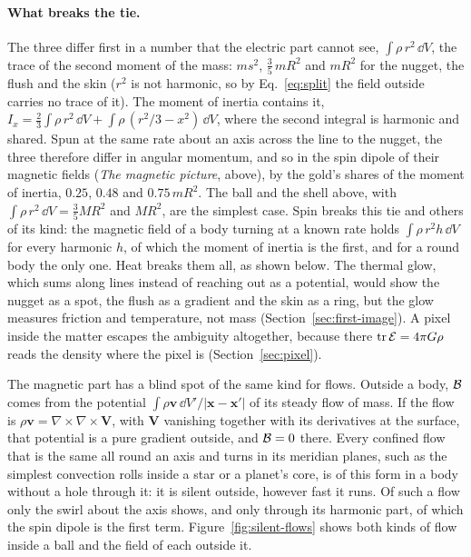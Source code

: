 \paragraph{What breaks the tie.} The three differ first in a number that the
electric part cannot see, $\int\rho\,r^2\,\dd V$, the trace of the second
moment of the mass: $m s^2$, $\tfrac35\,m R^2$ and $m R^2$ for the nugget, the
flush and the skin ($r^2$ is not harmonic, so by Eq.~\eqref{eq:split} the
field outside carries no trace of it). The moment of inertia contains it,
$I_x = \tfrac23\int\rho\,r^2\,\dd V + \int\rho\,(r^2/3 - x^2)\,\dd V$, where the
second integral is harmonic and shared. Spun at the same rate about an axis
across the line to the nugget, the three therefore differ in angular momentum,
and so in the spin dipole of their magnetic fields
(\emph{The magnetic picture}, above), by the gold's shares of the moment of inertia,
$0.25$, $0.48$ and $0.75\,mR^2$. The ball and the shell above, with
$\int\rho\,r^2\,\dd V = \tfrac35 MR^2$ and $MR^2$, are the simplest case. Spin
breaks this tie and others of its kind: the magnetic field of a body turning at
a known rate holds $\int\rho\,r^2 h\,\dd V$ for every harmonic $h$, of which the
moment of inertia is the first, and for a round body the only one. Heat breaks
them all, as shown below. The
thermal glow, which sums along lines instead of reaching out as a potential,
would show the nugget as a spot, the flush as a gradient and the skin as a ring,
but the glow measures friction and temperature, not mass
(Section~\ref{sec:first-image}). A pixel inside the matter escapes the
ambiguity altogether, because there $\mathrm{tr}\,\mathcal{E} = 4\pi G\rho$ reads the
density where the pixel is (Section~\ref{sec:pixel}).

The magnetic part has a blind spot of the same kind for flows. Outside a body,
$\mathcal{B}$ comes from the potential $\int\rho\mathbf{v}\,\dd V'/|\mathbf{x} -
\mathbf{x}'|$ of its steady flow of mass. If the flow is
$\rho\mathbf{v} = \nabla\times\nabla\times\mathbf{V}$, with $\mathbf{V}$ vanishing
together with its derivatives at the surface, that potential is a pure gradient
outside, and $\mathcal{B} = 0$ there. Every confined flow that is the same all round an axis and turns in its
meridian planes, such as the simplest convection rolls inside a star or a
planet's core, is of this form in a body without a hole through it: it is silent outside, however fast it runs. Of
such a flow only the swirl about the axis shows, and only through its harmonic
part, of which the spin dipole is the first term.
Figure~\ref{fig:silent-flows} shows both kinds of flow inside a ball and the
field of each outside it.

